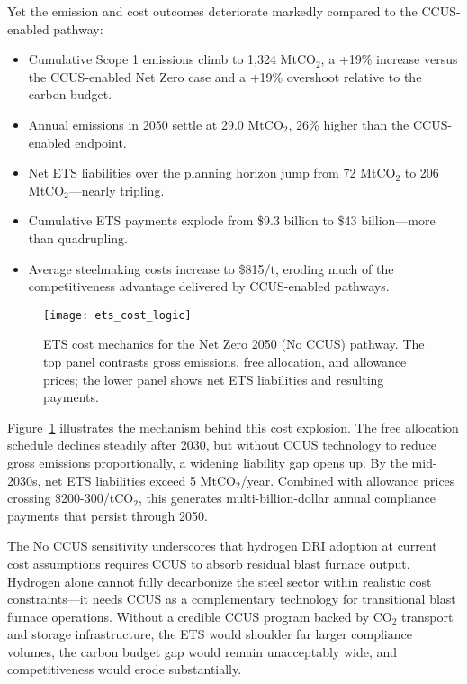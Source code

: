 Yet the emission and cost outcomes deteriorate markedly compared to the CCUS-enabled pathway:

\begin{itemize}[leftmargin=*]
  \item Cumulative Scope 1 emissions climb to 1,324 MtCO$_2$, a +19\% increase versus the CCUS-enabled Net Zero case and a +19\% overshoot relative to the carbon budget.
  \item Annual emissions in 2050 settle at 29.0 MtCO$_2$, 26\% higher than the CCUS-enabled endpoint.
  \item Net ETS liabilities over the planning horizon jump from 72 MtCO$_2$ to 206 MtCO$_2$—nearly tripling.
  \item Cumulative ETS payments explode from \$9.3 billion to \$43 billion—more than quadrupling.
  \item Average steelmaking costs increase to \$815/t, eroding much of the competitiveness advantage delivered by CCUS-enabled pathways.
\end{itemize}

\begin{figure}[!t]
  \centering
  \texttt{[image: ets\_cost\_logic]}
  \caption{ETS cost mechanics for the Net Zero 2050 (No CCUS) pathway. The top panel contrasts gross emissions, free allocation, and allowance prices; the lower panel shows net ETS liabilities and resulting payments.}
  \label{fig:ets-logic}
\end{figure}

Figure~\ref{fig:ets-logic} illustrates the mechanism behind this cost explosion. The free allocation schedule declines steadily after 2030, but without CCUS technology to reduce gross emissions proportionally, a widening liability gap opens up. By the mid-2030s, net ETS liabilities exceed 5 MtCO$_2$/year. Combined with allowance prices crossing \$200-300/tCO$_2$, this generates multi-billion-dollar annual compliance payments that persist through 2050.

The No CCUS sensitivity underscores that hydrogen DRI adoption at current cost assumptions requires CCUS to absorb residual blast furnace output. Hydrogen alone cannot fully decarbonize the steel sector within realistic cost constraints—it needs CCUS as a complementary technology for transitional blast furnace operations. Without a credible CCUS program backed by CO$_2$ transport and storage infrastructure, the ETS would shoulder far larger compliance volumes, the carbon budget gap would remain unacceptably wide, and competitiveness would erode substantially.

